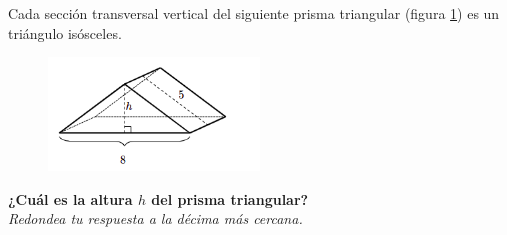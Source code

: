 \question[15] Cada sección transversal vertical del siguiente prisma triangular (figura \ref{fig:pitagoras3D_pris_01}) es un triángulo isósceles.
\begin{figure}[H]
    \begin{center}
        \includegraphics[width=0.5\textwidth]{../images/pitagoras3D_pris_01.png}
    \end{center}
    \caption{}
    \label{fig:pitagoras3D_pris_01}
\end{figure}
\textbf{¿Cuál es la altura $h$ del prisma triangular?}\\
\textit{Redondea tu respuesta a la décima más cercana.}
